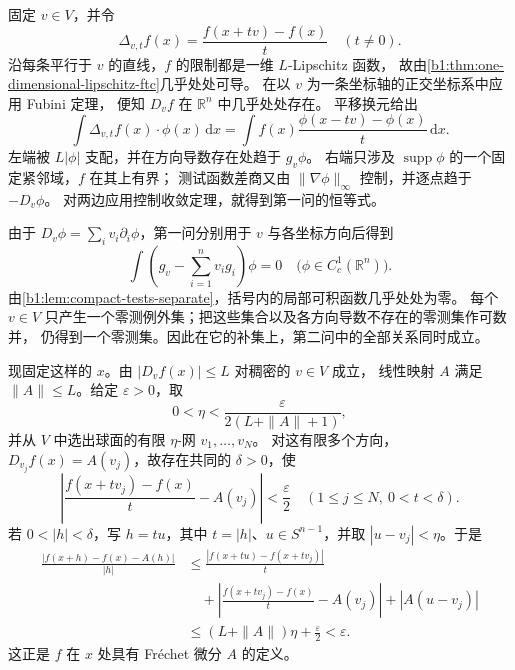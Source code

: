 \begin{solution}
固定 \(v\in V\)，并令
\[
 \Delta_{v,t}f(x)=\frac{f(x+tv)-f(x)}t
 \quad(t\ne0).
\]
沿每条平行于 \(v\) 的直线，\(f\) 的限制都是一维 \(L\)-Lipschitz 函数，
故由\cref{b1:thm:one-dimensional-lipschitz-ftc}几乎处处可导。
在以 \(v\) 为一条坐标轴的正交坐标系中应用 Fubini 定理，
便知 \(D_vf\) 在 \(\mathbb R^n\) 中几乎处处存在。
平移换元给出
\[
 \int\Delta_{v,t}f(x)\cdot\phi(x)\,\mathrm dx
 =\int f(x)\frac{\phi(x-tv)-\phi(x)}t\,\mathrm dx.
\]
左端被 \(L|\phi|\) 支配，并在方向导数存在处趋于 \(g_v\phi\)。
右端只涉及 \(\operatorname{supp}\phi\) 的一个固定紧邻域，\(f\) 在其上有界；
测试函数差商又由 \(\|\nabla\phi\|_\infty\) 控制，并逐点趋于 \(-D_v\phi\)。
对两边应用控制收敛定理，就得到第一问的恒等式。

由于 \(D_v\phi=\sum_i v_i\partial_i\phi\)，第一问分别用于 \(v\) 与各坐标方向后得到
\[
 \int\left(g_v-\sum_{i=1}^n v_i g_i\right)\phi=0
 \quad\bigl(\phi\in C_c^1(\mathbb R^n)\bigr).
\]
由\cref{b1:lem:compact-tests-separate}，括号内的局部可积函数几乎处处为零。
每个 \(v\in V\) 只产生一个零测例外集；把这些集合以及各方向导数不存在的零测集作可数并，
仍得到一个零测集。因此在它的补集上，第二问中的全部关系同时成立。

现固定这样的 \(x\)。由 \(|D_vf(x)|\leq L\) 对稠密的 \(v\in V\) 成立，
线性映射 \(A\) 满足 \(\|A\|\leq L\)。给定 \(\varepsilon>0\)，取
\[
 0<\eta<\frac{\varepsilon}{2(L+\|A\|+1)},
\]
并从 \(V\) 中选出球面的有限 \(\eta\)-网 \(v_1,\ldots,v_N\)。
对这有限多个方向，\(D_{v_j}f(x)=A(v_j)\)，故存在共同的 \(\delta>0\)，使
\[
 \left|\frac{f(x+tv_j)-f(x)}t-A(v_j)\right|<\frac\varepsilon2
 \quad(1\leq j\leq N,\ 0<t<\delta).
\]
若 \(0<|h|<\delta\)，写 \(h=tu\)，其中 \(t=|h|\)、\(u\in S^{n-1}\)，并取
\(|u-v_j|<\eta\)。于是
\begin{align*}
 \frac{|f(x+h)-f(x)-A(h)|}{|h|}
 &\leq \frac{|f(x+tu)-f(x+tv_j)|}{t}\\
 &\quad+\left|\frac{f(x+tv_j)-f(x)}t-A(v_j)\right|
       +|A(u-v_j)|\\
 &\leq (L+\|A\|)\eta+\frac\varepsilon2
 <\varepsilon.
\end{align*}
这正是 \(f\) 在 \(x\) 处具有 Fr\'echet 微分 \(A\) 的定义。
\end{solution}
